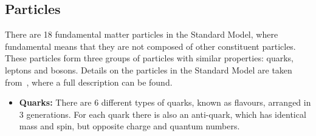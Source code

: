 \subsection{Particles}
\label{sec:theo-sm_particles}

There are 18 fundamental matter particles in the Standard Model,
where fundamental means that they are not composed of other constituent particles.
These particles form three groups of particles with similar properties: quarks, leptons and bosons.
Details on the particles in the Standard Model are taken from~\cite{obj-bjets_PDG}, where a full description can be found.

\begin{itemize}[leftmargin=*]
\item\textbf{Quarks:}
  There are 6 different types of quarks, known as flavours, arranged in 3 generations.
  For each quark there is also an anti-quark, which has identical mass and spin, but opposite charge and quantum numbers.  \vspace{0.5em}
  


\end{itemize}
